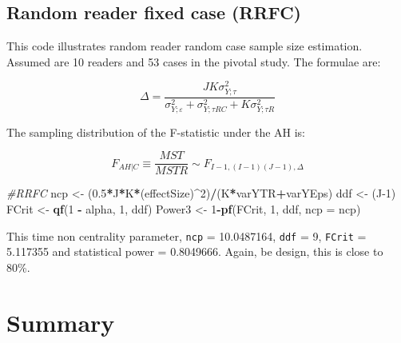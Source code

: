 \documentclass[
]{book}
\newenvironment{Shaded}{\begin{snugshade}}{\end{snugshade}}
\newcommand{\CommentTok}[1]{\textcolor[rgb]{0.56,0.35,0.01}{\textit{#1}}}
\newcommand{\DataTypeTok}[1]{\textcolor[rgb]{0.13,0.29,0.53}{#1}}
\newcommand{\DecValTok}[1]{\textcolor[rgb]{0.00,0.00,0.81}{#1}}
\newcommand{\FloatTok}[1]{\textcolor[rgb]{0.00,0.00,0.81}{#1}}
\newcommand{\KeywordTok}[1]{\textcolor[rgb]{0.13,0.29,0.53}{\textbf{#1}}}
\newcommand{\NormalTok}[1]{#1}
\newcommand{\OperatorTok}[1]{\textcolor[rgb]{0.81,0.36,0.00}{\textbf{#1}}}
\newcommand{\StringTok}[1]{\textcolor[rgb]{0.31,0.60,0.02}{#1}}
\begin{document}
\hypertarget{random-reader-fixed-case-rrfc}{%
\subsection{Random reader fixed case (RRFC)}\label{random-reader-fixed-case-rrfc}}

This code illustrates random reader random case sample size estimation. Assumed are 10 readers and 53 cases in the pivotal study. The formulae are:

\begin{equation*} 
\Delta =\frac{JK\sigma _{Y;\tau }^{2}}{\sigma _{Y;\varepsilon }^{2}+\sigma _{Y;\tau RC}^{2}+K\sigma _{Y;\tau R}^{2}}
\end{equation*}

The sampling distribution of the F-statistic under the AH is:

\begin{equation*} 
{F_{\left. AH \right|C}}\equiv \frac{MST}{MSTR}\sim{F_{I-1,\left( I-1 \right)\left( J-1 \right),\Delta }}
\end{equation*}

\begin{Shaded}
\begin{Highlighting}[]
\CommentTok{\#RRFC}
\NormalTok{ncp \textless{}{-}}\StringTok{ }\NormalTok{(}\FloatTok{0.5}\OperatorTok{*}\NormalTok{J}\OperatorTok{*}\NormalTok{K}\OperatorTok{*}\NormalTok{(effectSize)}\OperatorTok{\^{}}\DecValTok{2}\NormalTok{)}\OperatorTok{/}\NormalTok{(K}\OperatorTok{*}\NormalTok{varYTR}\OperatorTok{+}\NormalTok{varYEps)}
\NormalTok{ddf \textless{}{-}}\StringTok{ }\NormalTok{(J}\DecValTok{{-}1}\NormalTok{)}
\NormalTok{FCrit \textless{}{-}}\StringTok{ }\KeywordTok{qf}\NormalTok{(}\DecValTok{1} \OperatorTok{{-}}\StringTok{ }\NormalTok{alpha, }\DecValTok{1}\NormalTok{, ddf)}
\NormalTok{Power3 \textless{}{-}}\StringTok{ }\DecValTok{1}\OperatorTok{{-}}\KeywordTok{pf}\NormalTok{(FCrit, }\DecValTok{1}\NormalTok{, ddf, }\DataTypeTok{ncp =}\NormalTok{ ncp)}
\end{Highlighting}
\end{Shaded}

This time non centrality parameter, \texttt{ncp} = 10.0487164, \texttt{ddf} = 9, \texttt{FCrit} = 5.117355 and statistical power = 0.8049666. Again, be design, this is close to 80\%.

\hypertarget{summary-5}{%
\section{Summary}\label{summary-5}}
\end{document}
